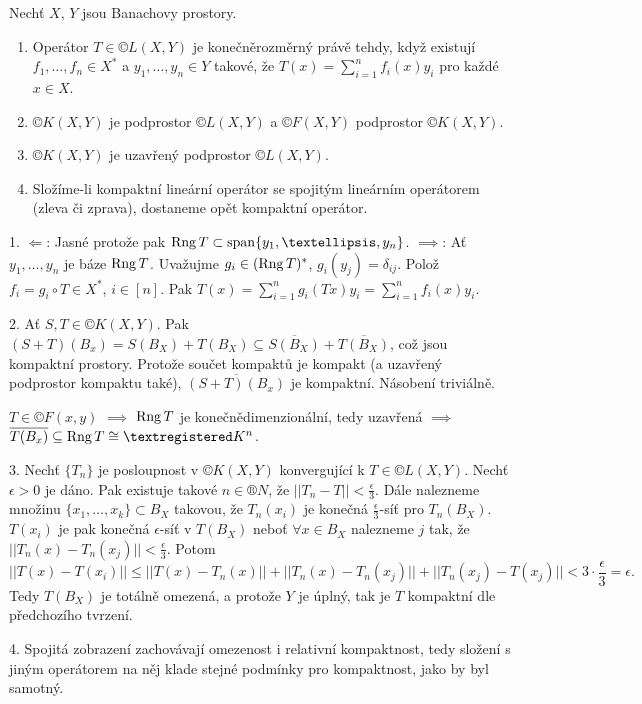 \documentclass[12pt]{article}					%
\begin{document}
\begin{veta}
	Nechť $X$, $Y$ jsou Banachovy prostory.

	\begin{enumerate}
		\item Operátor $T \in ©L(X, Y)$ je konečněrozměrný právě tehdy, když existují $f_1, …, f_n \in X^*$ a $y_1, …, y_n \in Y$ takové, že $T(x) = \sum_{i = 1}^n f_i(x)y_i$ pro každé $x \in X$.
		\item $©K(X, Y)$ je podprostor $©L(X, Y)$ a $©F(X, Y)$ podprostor $©K(X, Y)$.
		\item $©K(X, Y)$ je uzavřený podprostor $©L(X, Y)$.
		\item Složíme-li kompaktní lineární operátor se spojitým lineárním operátorem (zleva či zprava), dostaneme opět kompaktní operátor.
	\end{enumerate}

	\begin{dukazin}
		1. $\Leftarrow$: Jasné protože pak $\Rang T \subset \spn\{y_1, …, y_n\}$. $\implies$: Ať $y_1, …, y_n$ je báze $\operatorname{Rng} T$. Uvažujme $g_i \in (\operatorname{Rng} T)^*$, $g_i(y_j) = \delta_{ij}$. Polož $f_i = g_i \circ T \in X^*$, $i \in [n]$. Pak $T(x) = \sum_{i=1}^n g_i(Tx)y_i = \sum_{i=1}^n f_i(x)y_i$.

		2. Ať $S, T \in ©K(X, Y)$. Pak $(S + T)(B_x) = S(B_X) + T(B_X) \subseteq \overline{S(B_X)} + \overline{T(B_X)}$, což jsou kompaktní prostory. Protože součet kompaktů je kompakt (a uzavřený podprostor kompaktu také), $\overline{(S + T)(B_x)}$ je kompaktní. Násobení triviálně.

		$T \in ©F(x, y)$ $\implies$ $\operatorname{Rng} T$ je konečnědimenzionální, tedy uzavřená $\implies$ $\overline{T(B_x)} \subseteq \Rang T \cong ®K^n$.
	\end{dukazin}

	\begin{dukazin}
		3. Nechť $\{T_n\}$ je posloupnost v $©K(X, Y)$ konvergující k $T \in ©L(X, Y)$. Nechť $\epsilon > 0$ je dáno. Pak existuje takové $n \in ®N$, že $||T_n - T|| < \frac{\epsilon}{3}$. Dále nalezneme množinu $\{x_1, …, x_k\}\subset B_X$ takovou, že $T_n(x_i)$ je konečná $\frac{\epsilon}{3}$-síť pro $T_n(B_X)$. $T(x_i)$ je pak konečná $\epsilon$-síť v $T(B_X)$ neboť $\forall x \in B_X$ nalezneme $j$ tak, že $||T_n(x) - T_n(x_j)|| < \frac{\epsilon}{3}$. Potom
		$$ ||T(x) - T(x_i)|| ≤ ||T(x) - T_n(x)|| + ||T_n(x) - T_n(x_j)|| + ||T_n(x_j) - T(x_j)|| < 3·\frac{\epsilon}{3} = \epsilon. $$
		Tedy $T(B_X)$ je totálně omezená, a protože $Y$ je úplný, tak je $T$ kompaktní dle předchozího tvrzení.

		4. Spojitá zobrazení zachovávají omezenost i relativní kompaktnost, tedy složení s jiným operátorem na něj klade stejné podmínky pro kompaktnost, jako by byl samotný.
	\end{dukazin}
\end{veta}
\end{document}
